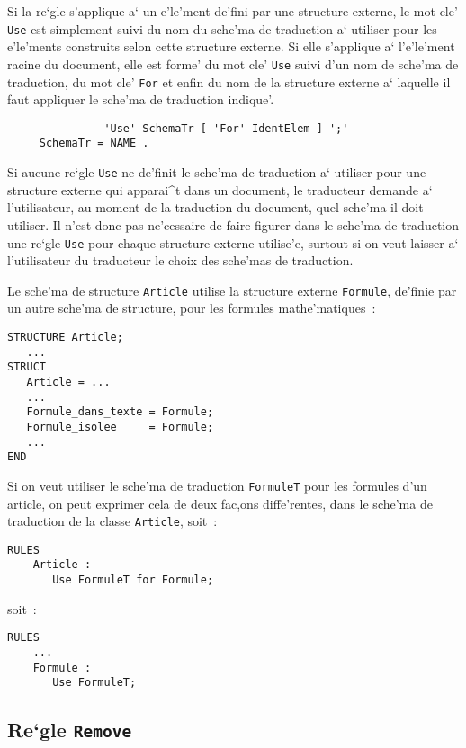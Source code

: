 {Si la re`gle s'applique a` un e'le'ment de'fini par une structure externe,
le mot cle' {\tt Use} est simplement suivi du nom du sche'ma de traduction a`
utiliser pour les e'le'ments construits selon cette structure externe. Si elle
s'applique a` l'e'le'ment racine du document, elle est forme' du mot cle' {\tt Use}
suivi d'un nom de sche'ma de traduction, du mot cle' {\tt For} et enfin du nom
de la structure externe a` laquelle il faut appliquer le sche'ma de traduction
indique'.

\begin{verbatim}
               'Use' SchemaTr [ 'For' IdentElem ] ';'
     SchemaTr = NAME .
\end{verbatim}

Si aucune re`gle {\tt Use} ne de'finit le sche'ma de traduction a` utiliser pour
une structure externe qui apparai^t dans un document, le traducteur demande
a` l'utilisateur, au moment de la traduction du document, quel sche'ma il
doit utiliser. Il n'est donc pas ne'cessaire de faire figurer dans le sche'ma
de traduction une re`gle {\tt Use} pour chaque structure externe utilise'e,
surtout si on veut laisser a` l'utilisateur du traducteur le choix des
sche'mas de traduction.

\begin{example}
Le sche'ma de structure {\tt Article} utilise la structure externe
{\tt Formule}, de'finie par un autre sche'ma de structure, pour les formules
mathe'matiques~:
\begin{verbatim}
STRUCTURE Article;
   ...
STRUCT
   Article = ...
   ...
   Formule_dans_texte = Formule;
   Formule_isolee     = Formule;
   ...
END
\end{verbatim}
Si on veut utiliser le sche'ma de traduction {\tt FormuleT} pour les formules
d'un article, on peut exprimer cela de deux fac,ons diffe'rentes, dans le
sche'ma de traduction de la classe {\tt Article}, soit~:
\begin{verbatim}
RULES
    Article :
       Use FormuleT for Formule;
\end{verbatim}
soit~:
\begin{verbatim}
RULES
    ...
    Formule :
       Use FormuleT;
\end{verbatim}
\end{example}

\subsection{Re`gle {\tt Remove}}
\label{remove}

}
